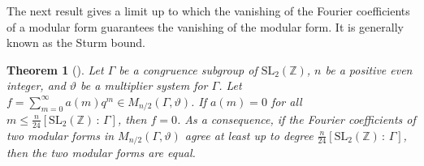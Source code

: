 \documentclass[11pt,a4paper]{amsart}
\newtheorem{theorem}{Theorem}[section]
\theoremstyle{definition}
\newcommand{\SZ}{\mathbb{Z}}                    %
\begin{document}
The next result gives a limit up to which the vanishing of the Fourier coefficients of a modular form guarantees the vanishing of the modular form. It is generally known as the Sturm bound. %
\begin{theorem}[{\cite[Theorem 1]{sturm1987congruence}}]
\label{thm:sturmbound}
Let $\Gamma$ be a congruence subgroup of $\mathrm{SL}_2(\SZ)$, $n$ be a positive even integer, and $\vartheta$ be a multiplier system for $\Gamma$. Let $f=\sum_{m=0}^{\infty} a(m)q^m \in M_{n/2}(\Gamma,\vartheta)$. If $a(m)=0$ for all $m \leq \frac{n}{24} [\mathrm{SL}_2(\SZ) \, : \, \Gamma ]$, then $f=0$. As a consequence, if the Fourier coefficients of two modular forms in $M_{n/2}(\Gamma,\vartheta)$ agree at least up to degree $\frac{n}{24} [\mathrm{SL}_2(\SZ) \, : \, \Gamma ]$, then the two modular forms are equal.
\end{theorem}
\begin{comment}
\begin{proof} If $k$ is even, then the statement follows from the standard version of the Sturm bound \cite[Theorem 1]{sturm1987congruence}.
	
Suppose that $k$ is odd and set $B=\frac{k}{24} [\mathrm{SL}_2(\SZ) \, : \, \Gamma(N) ]$. Since $a_f(n)=0$ for $n \leq B$, the Fourier expansion of $f$ at $\infty$ can be written as
\[ f=q^{B+1}(a_f(B+2)+a_f(B+2)q+dots). \]
The function $f^4 \in M_{2k}(\Gamma(N))$ is an integral weight modular form. The Fourier expansion of $f^4$ at $\infty$ looks as
\[ f^4 = q^4(B+1) \left( sum_{n=0}^{\infty} c_n q^n \right) \]
where $c_n$ is in terms of $a_f(i)$ for $i \leq n$. Since the Fourier coefficients of $f^4$ are zero up to $4B = \frac{2k}{12}[\mathrm{SL}_2(\SZ) \, : \, \Gamma(N) ]$, the even case above implies that $f^4=0$. This implies that $f=0$, which proves the lemma. 
\end{proof}
ISSUES: 
1. The multiplier system of the eta function is NOT a Dirichlet character (of the element d), i.e. a homomorphism from SL\_2 but instead its associated with the metaplectic group, the double cover of SL\_2. Solution: scale up both the eta product and the theta function a la Gordon and Sinor
2. The theta function is a priori modular for Gamma(n). We need modularity for Gamma\_0(n) or at least for  Gamma\_1(n). And the characters also need to agree.
\end{comment}
\end{document}
